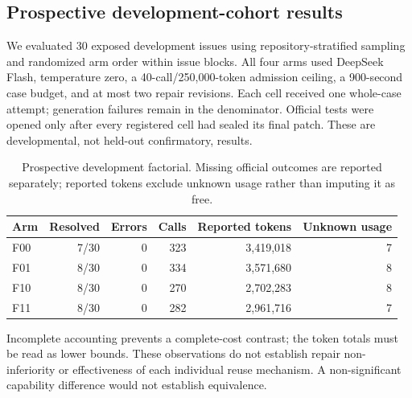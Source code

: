\subsection{Prospective development-cohort results}
We evaluated 30 exposed development issues using repository-stratified sampling and randomized arm order within issue blocks. All four arms used DeepSeek Flash, temperature zero, a 40-call/250,000-token admission ceiling, a 900-second case budget, and at most two repair revisions. Each cell received one whole-case attempt; generation failures remain in the denominator. Official tests were opened only after every registered cell had sealed its final patch. These are developmental, not held-out confirmatory, results.
\begin{table}[t]
\caption{Prospective development factorial. Missing official outcomes are reported separately; reported tokens exclude unknown usage rather than imputing it as free.}
\label{tab:development}
\begin{tabular}{@{}lrrrrr@{}}
\toprule
Arm & Resolved & Errors & Calls & Reported tokens & Unknown usage \\
\midrule
F00 & 7/30 & 0 & 323 & 3,419,018 & 7 \\
F01 & 8/30 & 0 & 334 & 3,571,680 & 8 \\
F10 & 8/30 & 0 & 270 & 2,702,283 & 8 \\
F11 & 8/30 & 0 & 282 & 2,961,716 & 7 \\
\bottomrule
\end{tabular}
\end{table}
Incomplete accounting prevents a complete-cost contrast; the token totals must be read as lower bounds.
These observations do not establish repair non-inferiority or effectiveness of each individual reuse mechanism. A non-significant capability difference would not establish equivalence.
